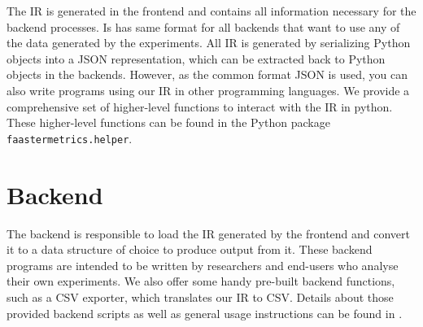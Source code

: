 \documentclass[../main.tex]{subfiles}
\begin{document}
The IR is generated in the frontend and contains all information necessary for the backend processes.
Is has same format for all backends that want to use any of the data generated by the experiments. 
All IR is generated by serializing Python objects into a JSON representation, 
which can be extracted back to Python objects in the backends. 
However, as the common format JSON is used, you can also write programs using our IR in other programming languages.
We provide a comprehensive set of higher-level functions to interact with the IR in python.
These higher-level functions can be found in the Python package \texttt{faastermetrics.helper}.

\section{Backend}%
\label{sec:analysisBackend}

The backend is responsible to load the IR generated by the frontend and convert it to a data structure of choice to produce output from it. 
These backend programs are intended to be written by researchers and end-users who analyse their own experiments. 
We also offer some handy pre-built backend functions, such as a CSV exporter, which translates our IR to CSV.
Details about those provided backend scripts as well as general usage instructions can be found in .
\end{document}
